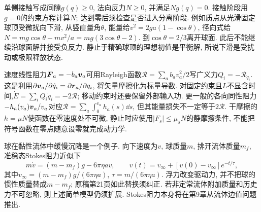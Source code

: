 单侧接触写成间隙$g(q)\ge0$, 法向反力$N\ge0$, 并满足$Ng(q)=0$. 接触阶段用$g=0$的约束方程计算$N$; 达到零后须检查是否进入分离阶段. 例如质点从光滑固定球顶受微扰向下滑, 从竖直量角$\theta$, 能量给$v^2=2ga(1-\cos\theta)$, 径向式给$N=mg\cos\theta-mv^2/a=mg(3\cos\theta-2)$. 到$\cos\theta=2/3$离开球面. 此后不能继续沿球面解并接受负反力. 静止于精确球顶的理想初值是平衡解, 所说下滑是受扰动或极限释放状态.

速度线性阻力$\boldsymbol{F}_a=-b_a\boldsymbol{v}_a$可用Rayleigh函数$\mathcal R=\sum_ab_av_a^2/2$写广义力$Q_i=-\mathcal R_{\dot q_i}$. 这是利用$\partial\boldsymbol{v}_a/\partial\dot q_i=\partial\boldsymbol{r}_a/\partial q_i$, 将矢量摩擦化为标量导数. 对固定约束且$L$不显含时间,$\dot E=\sum_iQ_i\dot q_i=-2\mathcal R$; 移动约束时还要保留外部输入功. 更一般的各向同性阻力$-h_a(v_a)\boldsymbol{v}_a/v_a$对应$\mathcal R=\sum_a\int_0^{v_a}h_a(s)\dd s$, 但其能量损失不一定等于$2\mathcal R$. 干摩擦的$h=\mu N$使函数在零速度处不可微, 静止时应使用$|F_s|\le\mu_sN$的静摩擦条件, 不能把符号函数在零点随意设零就完成动力学.

球在黏性流体中缓慢沉降是一个例子. 向下速度为$v$, 球质量$m$, 排开流体质量$m_f$, 准稳态Stokes阻力近似下
\[
m\dot v=(m-m_f)g-6\pi\eta av,
\qquad v(t)=v_\infty+[v(0)-v_\infty]e^{-t/\tau},
\]
其中$v_\infty=(m-m_f)g/(6\pi\eta a)$, $\tau=m/(6\pi\eta a)$. 浮力改变驱动力, 并不把球的惯性质量替成$m-m_f$; 原稿第21页如此替换须纠正. 若非定常流体附加质量和历史力不可忽略, 则上述简单模型仍须扩展. Stokes阻力本身将在第9章从流体边值问题推出.
